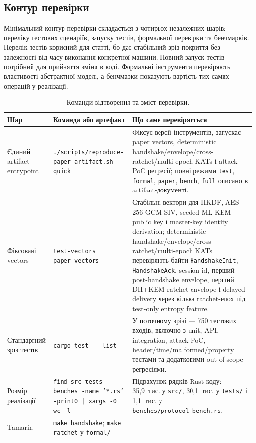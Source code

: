 \documentclass[11pt,a4paper]{article}
\theoremstyle{definition}
\begin{document}
\subsection{Контур перевірки}

Мінімальний контур перевірки складається з чотирьох незалежних шарів:
переліку тестових сценаріїв, запуску тестів, формальної перевірки та
бенчмарків. Перелік тестів корисний для статті, бо дає стабільний
зріз покриття без залежності від часу виконання конкретної машини.
Повний запуск тестів потрібний для прийняття зміни в коді. Формальні
інструменти перевіряють властивості абстрактної моделі, а бенчмарки
показують вартість тих самих операцій у реалізації.

\begin{table}[tbp]
\centering
\caption{Команди відтворення та зміст перевірки.}
\label{tab:repro-commands}
\footnotesize
\begin{tabularx}{\textwidth}{@{}p{}YY@{}}
\toprule
Шар & Команда або артефакт & Що саме перевіряється \\
\midrule
Єдиний artifact-entrypoint &
\texttt{./scripts/reproduce-paper-artifact.sh quick} &
Фіксує версії інструментів, запускає paper vectors, deterministic
handshake/envelope/cross-ratchet/multi-epoch KATs і attack-PoC регресії; повні режими
\texttt{test}, \texttt{formal}, \texttt{paper}, \texttt{bench},
\texttt{full} описано в artifact-документі. \\
\addlinespace
Фіксовані vectors &
\texttt{test-vectors paper\_vectors} &
Стабільні вектори для HKDF, AES-256-GCM-SIV, seeded ML-KEM public key
і master-key identity derivation; deterministic
handshake/envelope/cross-ratchet/multi-epoch KATs перевіряють байти
\texttt{HandshakeInit}, \texttt{HandshakeAck}, session id, перший
post-handshake envelope, перший DH+KEM ratchet envelope і delayed delivery
через кілька ratchet-епох під test-only entropy feature. \\
\addlinespace
Стандартний зріз тестів &
\texttt{cargo test -- --list} &
У поточному зрізі — 750 тестових
входів, включно з unit, API, integration, attack-PoC,
header/time/malformed/property тестами та додатковими out-of-scope
регресіями. \\
\addlinespace
Розмір реалізації &
\texttt{find src tests benches -name '*.rs' -print0 | xargs -0 wc -l} &
Підрахунок рядків Rust-коду: 35{,}9~тис. у \texttt{src/},
30{,}1~тис. у \texttt{tests/} і 1{,}1~тис. у
\texttt{benches/protocol\_bench.rs}. \\
\addlinespace
Tamarin &
\texttt{make handshake}; \texttt{make ratchet} у \texttt{formal/} &

\end{tabularx}
\end{table}
\end{document}
